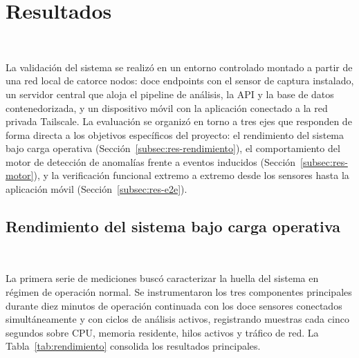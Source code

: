 \section{Resultados}
~\label{sec:resultados}

La validación del sistema se realizó en un entorno controlado 
montado a partir de una red local de catorce nodos: doce endpoints 
con el sensor de captura instalado, un servidor central que aloja 
el pipeline de análisis, la API y la base de datos 
contenedorizada, y un dispositivo móvil con la aplicación 
conectado a la red privada Tailscale. La evaluación se organizó en 
torno a tres ejes que responden de forma directa a los objetivos 
específicos del proyecto: el rendimiento del sistema bajo carga 
operativa (Sección~\ref{subsec:res-rendimiento}), el comportamiento 
del motor de detección de anomalías frente a eventos inducidos 
(Sección~\ref{subsec:res-motor}), y la verificación funcional 
extremo a extremo desde los sensores hasta la aplicación móvil 
(Sección~\ref{subsec:res-e2e}).

\subsection{Rendimiento del sistema bajo carga operativa}
~\label{subsec:res-rendimiento}

La primera serie de mediciones buscó caracterizar la huella del 
sistema en régimen de operación normal. Se instrumentaron los tres 
componentes principales durante diez minutos de operación 
continuada con los doce sensores conectados simultáneamente y con 
ciclos de análisis activos, registrando muestras cada cinco 
segundos sobre CPU, memoria residente, hilos activos y tráfico de 
red. La Tabla~\ref{tab:rendimiento} consolida los resultados 
principales.

